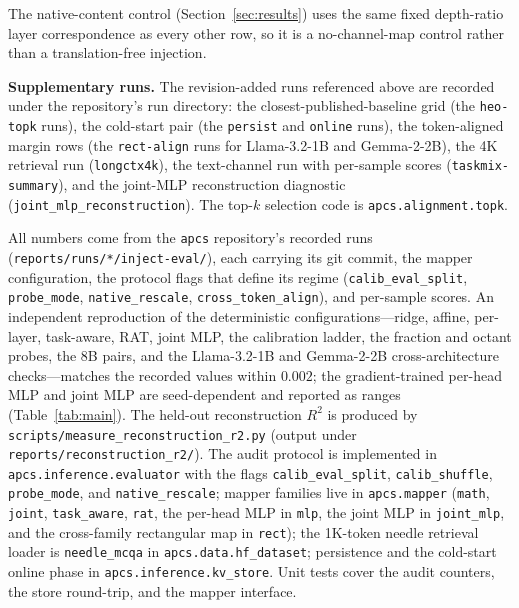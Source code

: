 \documentclass{article} %
\begin{document}
The native-content control (Section~\ref{sec:results}) uses the same fixed
depth-ratio layer correspondence as every other row, so it is a
no-channel-map control rather than a translation-free injection.

\textbf{Supplementary runs.} The revision-added runs referenced above are
recorded under the repository's run directory: the closest-published-baseline
grid (the \texttt{heo-topk} runs), the cold-start pair (the \texttt{persist} and
\texttt{online} runs), the token-aligned margin rows (the \texttt{rect-align}
runs for Llama-3.2-1B and Gemma-2-2B), the 4K retrieval run
(\texttt{longctx4k}), the text-channel run with per-sample scores
(\texttt{taskmix-summary}), and the joint-MLP reconstruction diagnostic
(\texttt{joint\_mlp\_reconstruction}). The top-$k$ selection code is
\texttt{apcs.alignment.topk}.

All numbers come from the \texttt{apcs} repository's recorded runs
(\texttt{reports/runs/*/inject-eval/}), each carrying its git commit, the
mapper configuration, the protocol flags that define its regime
(\texttt{calib\_eval\_\allowbreak split}, \texttt{probe\_mode},
\texttt{native\_\allowbreak rescale},
\texttt{cross\_\allowbreak token\_\allowbreak align}), and per-sample scores. An independent
reproduction of the deterministic configurations---ridge, affine, per-layer,
task-aware, RAT, joint MLP, the calibration ladder, the fraction and octant
probes, the 8B pairs, and the Llama-3.2-1B and Gemma-2-2B cross-architecture
checks---matches the recorded values within
$0.002$; the gradient-trained per-head MLP and joint MLP are seed-dependent and
reported as ranges (Table~\ref{tab:main}). The held-out
reconstruction $R^2$ is produced by \texttt{scripts/measure\_reconstruction\_r2.py}
(output under \texttt{reports/reconstruction\_r2/}). The audit protocol
is implemented in \texttt{apcs.\allowbreak inference.\allowbreak evaluator}
with the flags
\texttt{calib\_eval\_\allowbreak split}, \texttt{calib\_shuffle},
\texttt{probe\_mode},
and \texttt{native\_\allowbreak rescale}; mapper families live in
\texttt{apcs.\allowbreak mapper}
(\texttt{math}, \texttt{joint}, \texttt{task\_\allowbreak aware}, \texttt{rat}, the
per-head MLP in \texttt{mlp}, the joint MLP in \texttt{joint\_\allowbreak mlp}, and the
cross-family rectangular map in \texttt{rect}); the
1K-token needle retrieval loader is \texttt{needle\_\allowbreak mcqa} in
\texttt{apcs.\allowbreak data.\allowbreak hf\_\allowbreak dataset};
persistence and the cold-start online phase in
\texttt{apcs.inference.kv\_store}. Unit tests cover the audit counters, the
store round-trip, and the mapper interface.
\end{document}
